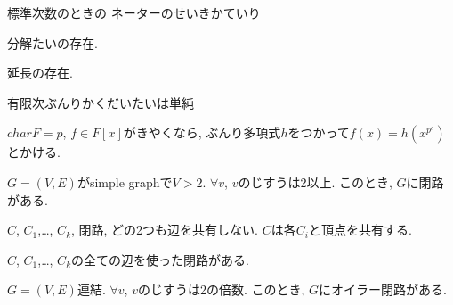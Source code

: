 \begin{prop}
標準次数のときの
  ネーターのせいきかていり
\end{prop}

\begin{prop}
  分解たいの存在.
\end{prop}

\begin{prop}
  延長の存在.
\end{prop}

\begin{prop}
  有限次ぶんりかくだいたいは単純
\end{prop}

\begin{prop}
  $char F=p$, $f\in F[x]$がきやくなら,
  ぶんり多項式$h$をつかって$f(x)=h(x^{p^e})$とかける.
\end{prop}



\begin{prop}
  $G=(V,E)$がsimple graphで$V>2$.
  $\forall v$, $v$のじすうは2以上.
  このとき, $G$に閉路がある.
\end{prop}

\begin{prop}
  $C$, $C_1$,\ldots, $C_k$, 閉路, どの2つも辺を共有しない.
  $C$は各$C_i$と頂点を共有する.

  $C$, $C_1$,\ldots, $C_k$の全ての辺を使った閉路がある.
\end{prop}


\begin{prop}
  $G=(V,E)$連結.
  $\forall v$, $v$のじすうは2の倍数.
  このとき, $G$にオイラー閉路がある.
\end{prop}

